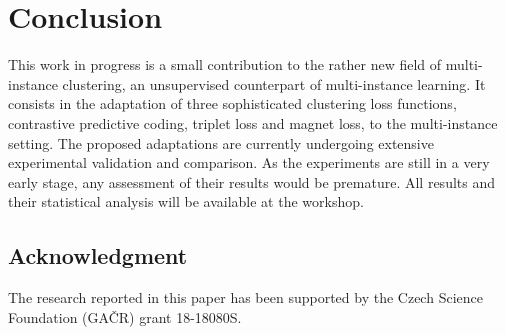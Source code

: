\documentclass[a4paper]{llncs}
\begin{document}
\section{Conclusion}

This work in progress is a small contribution to the rather new field of multi-instance clustering, an unsupervised counterpart of multi-instance learning.  It consists in the adaptation of three sophisticated clustering loss functions, contrastive predictive coding, triplet loss and magnet loss, to the multi-instance setting. The proposed adaptations are currently undergoing extensive experimental validation and comparison. As the experiments are still in a very early stage, any assessment of their results would be premature. All results and their statistical analysis will be available at the workshop.

\enlargethispage{\baselineskip}
\subsection*{Acknowledgment}

The research reported in this paper has been supported by the Czech Science Foundation (GA\v{C}R) grant 18-18080S.


\end{document}
